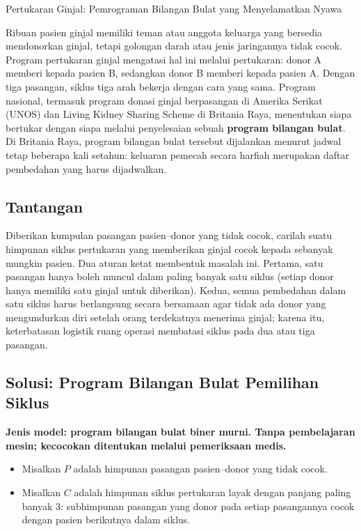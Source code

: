 \begin{casestudybox}{Pertukaran Ginjal: Pemrograman Bilangan Bulat yang Menyelamatkan Nyawa}
\label{case:kidney-exchange}

Ribuan pasien ginjal memiliki teman atau anggota keluarga yang bersedia mendonorkan ginjal, tetapi golongan darah atau jenis jaringannya tidak cocok. Program pertukaran ginjal mengatasi hal ini melalui pertukaran: donor A memberi kepada pasien B, sedangkan donor B memberi kepada pasien A. Dengan tiga pasangan, siklus tiga arah bekerja dengan cara yang sama. Program nasional, termasuk program donasi ginjal berpasangan di Amerika Serikat (UNOS) dan Living Kidney Sharing Scheme di Britania Raya, menentukan siapa bertukar dengan siapa melalui penyelesaian sebuah \textbf{program bilangan bulat}. Di Britania Raya, program bilangan bulat tersebut dijalankan menurut jadwal tetap beberapa kali setahun: keluaran pemecah secara harfiah merupakan daftar pembedahan yang harus dijadwalkan.

\subsection*{Tantangan}
Diberikan kumpulan pasangan pasien--donor yang tidak cocok, carilah suatu himpunan siklus pertukaran yang memberikan ginjal cocok kepada sebanyak mungkin pasien. Dua aturan ketat membentuk masalah ini. Pertama, satu pasangan hanya boleh muncul dalam paling banyak satu siklus (setiap donor hanya memiliki satu ginjal untuk diberikan). Kedua, semua pembedahan dalam satu siklus harus berlangsung secara bersamaan agar tidak ada donor yang mengundurkan diri setelah orang terdekatnya menerima ginjal; karena itu, keterbatasan logistik ruang operasi membatasi siklus pada dua atau tiga pasangan.

\subsection*{Solusi: Program Bilangan Bulat Pemilihan Siklus}
\textbf{Jenis model: program bilangan bulat biner murni. Tanpa pembelajaran mesin; kecocokan ditentukan melalui pemeriksaan medis.}

\begin{itemize}
\item Misalkan $P$ adalah himpunan pasangan pasien--donor yang tidak cocok.
\item Misalkan $C$ adalah himpunan siklus pertukaran layak dengan panjang paling banyak 3: subhimpunan pasangan yang donor pada setiap pasangannya cocok dengan pasien berikutnya dalam siklus.
\end{itemize}


\end{casestudybox}
